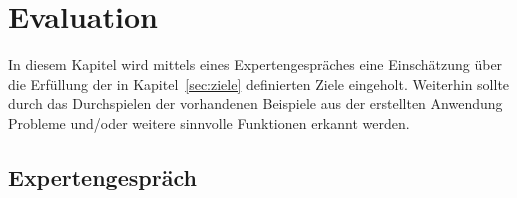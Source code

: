 \chapter{Evaluation}\label{ch:evaluation}
In diesem Kapitel wird mittels eines Expertengespräches eine Einschätzung über die Erfüllung der in
Kapitel~\ref{sec:ziele} definierten Ziele eingeholt.
Weiterhin sollte durch das Durchspielen der vorhandenen Beispiele aus der erstellten Anwendung Probleme und/oder weitere sinnvolle
Funktionen erkannt werden.

\section{Expertengespräch}\label{sec:expertengespraech}


